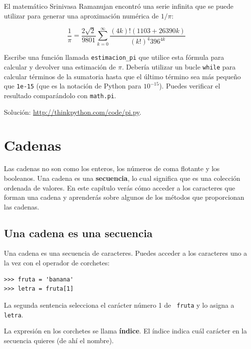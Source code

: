 \documentclass[10pt]{book}
\begin{document}
\begin{exercise}

El matemático Srinivasa Ramanujan encontró una
serie infinita
que se puede utilizar para generar una aproximación
numérica de $1 / \pi$:

\[ \frac{1}{\pi} = \frac{2\sqrt{2}}{9801}
\sum^\infty_{k=0} \frac{(4k)!(1103+26390k)}{(k!)^4 396^{4k}} \]

Escribe una función llamada \verb"estimacion_pi" que utilice esta fórmula
para calcular y devolver una estimación de $\pi$.  Debería utilizar un bucle {\tt while}
para calcular términos de la sumatoria hasta que el último término sea
más pequeño que {\tt 1e-15} (que es la notación de Python para $10^{-15}$).
Puedes verificar el resultado comparándolo con {\tt math.pi}.

Solución: \url{http://thinkpython.com/code/pi.py}.

\end{exercise}


\chapter{Cadenas}
\label{strings}

Las cadenas no son como los enteros, los números de coma flotante y los booleanos.  Una cadena
es una {\bf secuencia}, lo cual significa que es
una colección ordenada de valores.  En este capítulo verás
cómo acceder a los caracteres que forman una cadena y
aprenderás sobre algunos de los métodos que proporcionan las cadenas.


\section{Una cadena es una secuencia}

Una cadena es una secuencia de caracteres.
Puedes acceder a los caracteres uno a la vez con el
operador de corchetes:

\begin{verbatim}
>>> fruta = 'banana'
>>> letra = fruta[1]
\end{verbatim}
%
La segunda sentencia selecciona el carácter número 1 de {\tt
fruta} y lo asigna a {\tt letra}.

La expresión en los corchetes se llama {\bf índice}.
El índice indica cuál carácter en la secuencia
quieres (de ahí el nombre).
\end{document}
